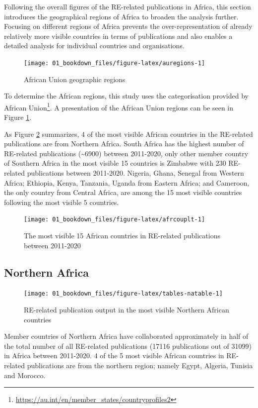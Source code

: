 \documentclass[
]{book}
\renewcommand{\href}[2]{#2\footnote{\url{#1}}}
\begin{document}
Following the overall figures of the RE-related publications in Africa, this section introduces the geographical regions of Africa to broaden the analysis further. Focusing on different regions of Africa prevents the over-representation of already relatively more visible countries in terms of publications and also enables a detailed analysis for individual countries and organisations.

\begin{figure}
\texttt{[image: 01\_bookdown\_files/figure-latex/auregions-1]} \caption{African Union geographic regions}\label{fig:auregions}
\end{figure}

To determine the African regions, this study uses \href{https://au.int/en/member_states/countryprofiles2}{the categorisation provided by African Union}. A presentation of the African Union regions can be seen in Figure \ref{fig:auregions}.

As Figure \ref{fig:afrcouplt} summarizes, 4 of the most visible African countries in the RE-related publications are from Northern Africa. South Africa has the highest number of RE-related publications (\textasciitilde6900) between 2011-2020, only other member country of Southern Africa in the most visible 15 countries is Zimbabwe with 230 RE-related publications between 2011-2020. Nigeria, Ghana, Senegal from Western Africa; Ethiopia, Kenya, Tanzania, Uganda from Eastern Africa; and Cameroon, the only country from Central Africa, are among the 15 most visible countries following the most visible 5 countries.

\begin{figure}
\texttt{[image: 01\_bookdown\_files/figure-latex/afrcouplt-1]} \caption{The most visible 15 African countries in  RE-related publications between 2011-2020}\label{fig:afrcouplt}
\end{figure}

\hypertarget{northern-africa}{%
\subsection{Northern Africa}\label{northern-africa}}

\begin{figure}
\texttt{[image: 01\_bookdown\_files/figure-latex/tables-natable-1]} \caption{RE-related publication output in the most visible Northern African countries}\label{fig:tables-natable}
\end{figure}

Member countries of Northern Africa have collaborated approximately in half of
the total number of all RE-related publications (17116 publications out of 31099) in Africa between 2011-2020. 4 of the 5 most visible African countries in RE-related publications are from the
northern region; namely Egypt, Algeria, Tunisia and Morocco.
\end{document}
